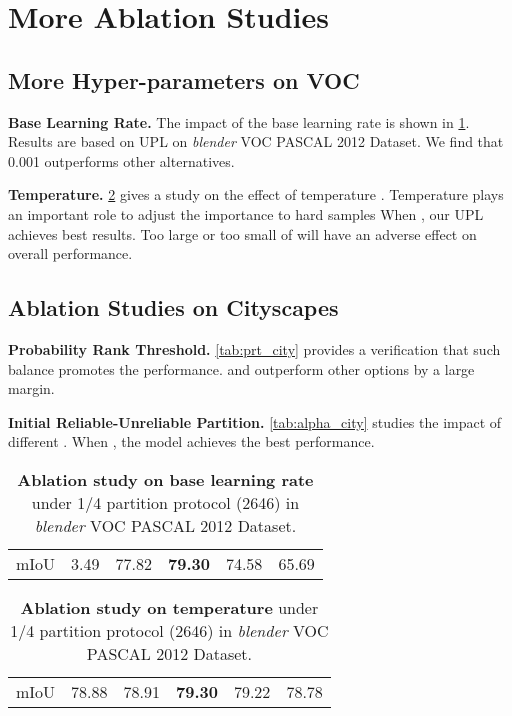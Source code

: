 \documentclass[10pt, twocolumn, letterpaper]{article}
\begin{document}
\section{More Ablation Studies}
\label{sec:hyper}


\subsection{More Hyper-parameters on VOC}
\label{sec:hyper_voc}
\noindent \textbf{Base Learning Rate.}
The impact of the base learning rate is shown in \cref{tab:baselr}. 
Results are based on  UPL on \textit{blender} VOC PASCAL 2012 Dataset. 
We find that 0.001 outperforms other alternatives.


\noindent \textbf{Temperature.}
\cref{tab:temperature} gives a study on the effect of temperature .
Temperature  plays an important role to adjust the importance to hard samples
When , our UPL achieves best results.
Too large or too small of  will have an adverse effect on overall performance.


\subsection{Ablation Studies on Cityscapes}
\label{sec:hyper_city}
\noindent\textbf{Probability Rank Threshold.} 
\cref{tab:prt_city} provides a verification that such balance promotes the performance.  and  outperform other options by a large margin.


\noindent\textbf{Initial Reliable-Unreliable Partition.} 
\cref{tab:alpha_city} studies the impact of different .
When , the model achieves the best performance.



\begin{table}[t]
\centering
\caption{
\textbf{Ablation study on base learning rate} under 1/4 partition protocol (2646) in \textit{blender} VOC PASCAL 2012 Dataset.
}
\setlength{\tabcolsep}{8.5pt}
\label{tab:baselr}
\vspace{-8pt}
\begin{tabular}{c|ccccc }
\toprule
& 
 &  &  &  &   \\
\midrule
mIoU 
& 3.49 & 77.82 &\textbf{79.30} &74.58  &65.69 \\
\bottomrule
\end{tabular}
\vspace{-5pt}
\end{table}


\begin{table}[t]
\centering
\caption{
\textbf{Ablation study on temperature} under 1/4 partition protocol (2646) in \textit{blender} VOC PASCAL 2012 Dataset.
}
\setlength{\tabcolsep}{8.4pt}
\label{tab:temperature}
\vspace{-8pt}
\begin{tabular}{c|ccccc }
\toprule
& 
 &  &  &  &   \\
\midrule
mIoU & 
78.88 & 78.91 &\textbf{79.30} &79.22  &78.78 \\
\bottomrule
\end{tabular}
\vspace{-5pt}
\end{table}
\end{document}
